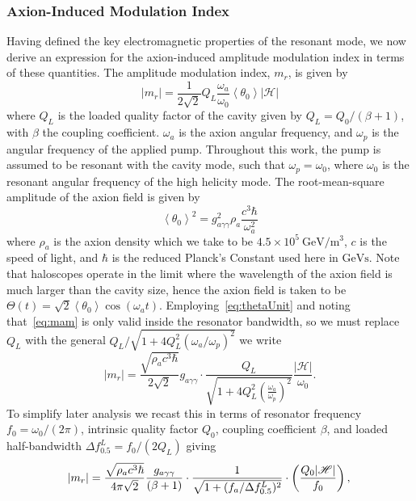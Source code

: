 \documentclass[
  aps,
  physrev,
  reprint,
  superscriptaddress,
  nofootinbib,
  amsmath,
  amssymb
]{revtex4-2}
\begin{document}
\subsubsection{Axion-Induced Modulation Index}
\label{sec:Axion_Mod_Index}

Having defined the key electromagnetic properties of the resonant mode, we now derive an expression for the axion-induced amplitude modulation index in terms of these quantities. The amplitude modulation index, $m_r$, is given by~\cite{Bourhill2023}
\begin{equation} \label{eq:mam}
    |m_{r}| = \frac{1}{2\sqrt{2}} Q_L\frac{\omega_a}{\omega_0} \left<\theta_0\right> |\mathscr{H}|
\end{equation}
where $Q_L$ is the loaded quality factor of the cavity given by $Q_L = Q_0/(\beta+1)$, with $\beta$ the coupling coefficient. $\omega_a$ is the axion angular frequency, and $\omega_p$ is the angular frequency of the applied pump. Throughout this work, the pump is assumed to be resonant with the cavity mode, such that $\omega_p=\omega_0$, where $\omega_0$ is the resonant angular frequency of the high helicity mode. The root-mean-square amplitude of the axion field is given by
\begin{equation} \label{eq:thetaUnit}
    \left<\theta_0\right>^2 = g_{a\gamma\gamma}^2\rho_a \frac{c^3 \hbar}{\omega_a^2}
\end{equation}
where $\rho_a$ is the axion density which we take to be $4.5\times10^5~\mathrm{GeV/m^3}$, $c$ is the speed of light, and $\hbar$ is the reduced Planck's Constant used here in $\mathrm{GeVs}$. Note that haloscopes operate in the limit where the wavelength of the axion field is much larger than the cavity size, hence the axion field is taken to be $\Theta (t) = \sqrt{2} \left<\theta_0\right> \cos(\omega_a t)$. Employing~\eqref{eq:thetaUnit} and noting that~\eqref{eq:mam} is only valid inside the resonator bandwidth, so we must replace $Q_L$ with the general $Q_L/\sqrt{1 + 4 Q_L^2 (\omega_a/\omega_p)^2}$ we write
\begin{equation}
    |m_{r}| = \frac{\sqrt{\rho_a c^3 \hbar}}{2\sqrt{2}} g_{a\gamma\gamma}\cdot\frac{Q_L}{\sqrt{1 + 4 Q_L^2(\frac{\omega_a}{\omega_p})^2}}\frac{|\mathscr{H}|}{\omega_0}.
\end{equation}
To simplify later analysis we recast this in terms of resonator frequency $f_0 = \omega_0/(2\pi)$, intrinsic quality factor $Q_0$, coupling coefficient $\beta$, and loaded half-bandwidth $\Delta f_{0.5}^L = f_0/(2Q_L)$ giving
\begin{equation}
    |m_r| = \frac{\sqrt{\rho_a c^3 \hbar}}{4\pi\sqrt{2}} \frac{g_{a\gamma\gamma}}{(\beta + 1)}\cdot\frac{1}{\sqrt{1 + (f_a/\Delta f_{0.5}^L)^2}}\cdot\left(\frac{Q_0|\mathscr{H}|}{f_0}\right), \\
    \label{eq:mr}
\end{equation}
\end{document}
